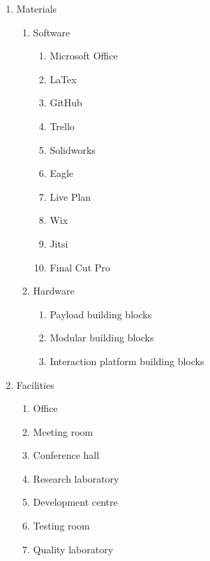 \begin{enumerate}[label*=\arabic*.]
	\item Materials
		\begin{enumerate}[label*=\arabic*.]
			\item Software
			\begin{enumerate}[label*=\arabic*.]
				\item Microsoft Office
				\item LaTex
				\item GitHub
				\item Trello
				\item Solidworks
				\item Eagle
				\item Live Plan
				\item Wix
				\item Jitsi
				\item Final Cut Pro
			\end{enumerate}
			\item Hardware
			\begin{enumerate}[label*=\arabic*.]
				\item Payload building blocks
				\item Modular building blocks
				\item Interaction platform building blocks
			\end{enumerate}
		\end{enumerate}
	
	\item Facilities
		\begin{enumerate}[label*=\arabic*.]
		\item Office
		\item Meeting room
		\item Conference hall
		\item Research laboratory
		\item Development centre
		\item Testing room
		\item Quality laboratory
		\end{enumerate}
	
\end{enumerate}